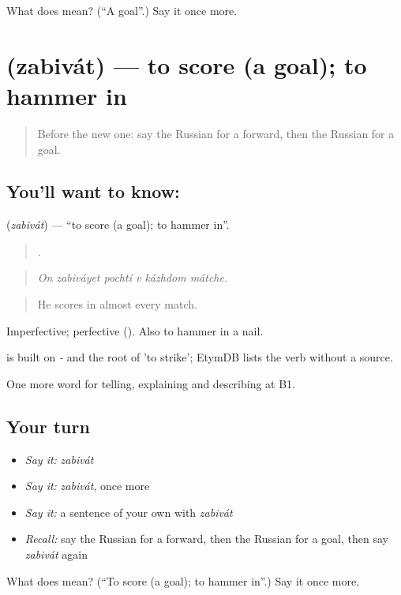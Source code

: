 \begin{tcolorbox}[breakable,colback=teal!4,colframe=teal!35!black,title={Before you move on}]
What does  mean? (\textquotedblleft{}A goal\textquotedblright{}.) Say it once more.
\end{tcolorbox}
\section[\texorpdfstring{\ru{забивать} (zabivát)}{забивать (zabivát)}]{ (zabivát) — to score (a goal); to hammer in}

\label{lesson:RU-C509-zabivat}



\begin{quote}
Before the new one: say the Russian for a forward, then the Russian for a goal.
\end{quote}

\subsection*{You'll want to know: }
\textbf{} (\emph{zabivát}) — \textquotedblleft{}to score (a goal); to hammer in\textquotedblright{}.

\begin{quote}
     .
\end{quote}

\begin{quote}
\emph{On zabiváyet pochtí v kázhdom mátche.}
\end{quote}

\begin{quote}
He scores in almost every match.
\end{quote}

Imperfective; perfective  (). Also to hammer in a nail.

\begin{cousinweb}
\emph{} is built on \emph{-} and the root of \emph{} 'to strike'; EtymDB lists the verb without a source.
\end{cousinweb}

\begin{grammarlens}[title={What you've built}]
One more word for telling, explaining and describing at B1.
\end{grammarlens}

\subsection*{Your turn}
\begin{itemize}
\raggedright
  \item \emph{Say it:} \emph{zabivát}
  \item \emph{Say it:} \emph{zabivát}, once more
  \item \emph{Say it:} a sentence of your own with \emph{zabivát}
  \item \emph{Recall:} say the Russian for a forward, then the Russian for a goal, then say \emph{zabivát} again
\end{itemize}

\begin{tcolorbox}[breakable,colback=teal!4,colframe=teal!35!black,title={Before you move on}]
What does  mean? (\textquotedblleft{}To score (a goal); to hammer in\textquotedblright{}.) Say it once more.
\end{tcolorbox}
